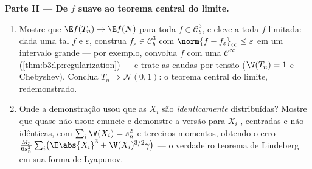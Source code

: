 \begin{problem}
\medskip
\noindent\textbf{Parte II --- De $f$ suave ao teorema central do
limite.}
\begin{enumerate}[resume]
  \item Mostre que $\E f(T_n) \to \E f(N)$ para toda $f \in
        \mathcal C_b^3$, e eleve a toda $f$ 
        limitada: dada uma tal $f$ e $\varepsilon$, construa $f_\varepsilon \in \mathcal C^3_b$ com $\norm{f - f_\varepsilon}_\infty \leq \varepsilon$
        em um intervalo grande --- por exemplo, convolua $f$ com uma
         $\mathcal C^\infty$ (\cref{thm:b3:lp:regularization}) --- e trate as caudas por
        tensão ($\V(T_n) = 1$ e Chebyshev). Conclua $T_n \Rightarrow \mathcal N(0, 1)$: o teorema central do
        limite, redemonstrado.
  \item Onde a demonstração usou que as $X_i$ são
        \emph{identicamente} distribuídas? Mostre que quase não usou:
        enuncie e demonstre a versão para $X_i$ ,
        centradas e não idênticas, com $\sum_i\V(X_i) = s_n^2$ e terceiros momentos,
        obtendo o erro $\frac{M_3}{6s_n^3}\sum_i\bigl(\E\abs{X_i}^3
        + \V(X_i)^{3/2}\gamma\bigr)$ --- o verdadeiro teorema de Lindeberg em sua
        forma de Lyapunov.
\end{enumerate}


\end{problem}
